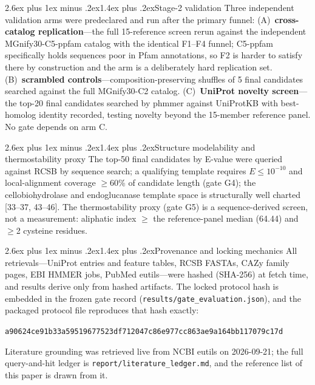 \documentclass[11pt]{article}
\makeatletter
\renewcommand{\subsection}{\@startsection{subsection}{2}{\z@}%
  {2.6ex plus 1ex minus .2ex}{1.4ex plus .2ex}{\large\bfseries\color{navy}}}
\makeatother
\begin{document}
\subsection{Stage-2 validation}
Three independent validation arms were predeclared and run after the primary funnel: (A)~\textbf{cross-catalog replication}---the full 15-reference screen rerun against the independent MGnify30-C5-ppfam catalog with the identical F1--F4 funnel; C5-ppfam specifically holds sequences poor in Pfam annotations, so F2 is harder to satisfy there by construction and the arm is a deliberately hard replication set. (B)~\textbf{scrambled controls}---composition-preserving shuffles of 5 final candidates searched against the full MGnify30-C2 catalog. (C)~\textbf{UniProt novelty screen}---the top-20 final candidates searched by phmmer against UniProtKB with best-homolog identity recorded, testing novelty beyond the 15-member reference panel. No gate depends on arm C.

\subsection{Structure modelability and thermostability proxy}
The top-50 final candidates by E-value were queried against RCSB by sequence search; a qualifying template requires $E \le 10^{-10}$ and local-alignment coverage $\ge$60\% of candidate length (gate G4); the cellobiohydrolase and endoglucanase template space is structurally well charted [33--37, 43--46]. The thermostability proxy (gate G5) is a sequence-derived screen, not a measurement: aliphatic index $\ge$ the reference-panel median (64.44) and $\ge$2 cysteine residues.

\subsection{Provenance and locking mechanics}
All retrievals---UniProt entries and feature tables, RCSB FASTAs, CAZy family pages, EBI HMMER jobs, PubMed eutils---were hashed (SHA-256) at fetch time, and results derive only from hashed artifacts. The locked protocol hash is embedded in the frozen gate record (\texttt{results/gate\_evaluation.json}), and the packaged protocol file reproduces that hash exactly:
\begin{center}\small\texttt{a90624ce91b33a59519677523df712047c86e977cc863ae9a164bb117079c17d}\end{center} Literature grounding was retrieved live from NCBI eutils on 2026-09-21; the full query-and-hit ledger is \texttt{report/literature\_ledger.md}, and the reference list of this paper is drawn from it.
\end{document}
